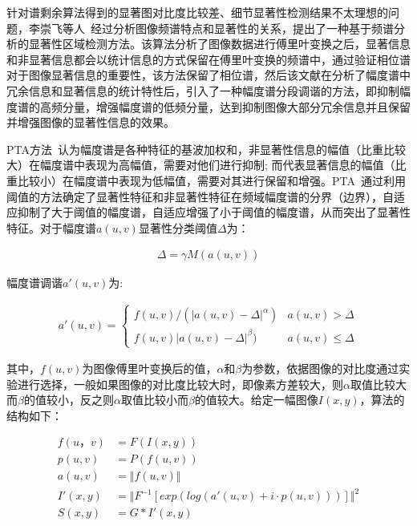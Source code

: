 针对谱剩余算法得到的显著图对比度比较差、细节显著性检测结果不太理想的问题，李崇飞等人~\cite{李崇飞2012相位谱}经过分析图像频谱特点和显著性的关系，提出了一种基于频谱分析的显著性区域检测方法。该算法分析了图像数据进行傅里叶变换之后，显著信息和非显著信息都会以统计信息的方式保留在傅里叶变换的频谱中，通过验证相位谱对于图像显著信息的重要性，该方法保留了相位谱，然后该文献在分析了幅度谱中冗余信息和显著信息的统计特性后，引入了一种幅度谱分段调谐的方法，即抑制幅度谱的高频分量，增强幅度谱的低频分量，达到抑制图像大部分冗余信息并且保留并增强图像的显著性信息的效果。

PTA方法~\cite{李崇飞2012相位谱}认为幅度谱是各种特征的基波加权和，非显著性信息的幅值（比重比较大）在幅度谱中表现为高幅值，需要对他们进行抑制; 而代表显著信息的幅值（比重比较小）在幅度谱中表现为低幅值，需要对其进行保留和增强。PTA~\cite{李崇飞2012相位谱}通过利用阈值的方法确定了显著性特征和非显著性特征在频域幅度谱的分界（边界），自适应抑制了大于阈值的幅度谱，自适应增强了小于阈值的幅度谱，从而突出了显著性特征。对于幅度谱$a(u,v)$显著性分类阈值$\Delta$为：
\begin{linenomath}
\begin{align}
\Delta=\gamma M(a(u,v))
\label{式3_20}
\end{align}
\end{linenomath}
幅度谱调谐$a'(u,v)$为:
\begin{linenomath}
\begin{align}
a'(u,v) = \left\{ \begin{array}{ll}
f(u,v)/(|a(u,v)-\Delta|^{\alpha}) & a(u,v)>\Delta\\
f(u,v)|a(u,v)-\Delta|^{\beta}) & a(u,v)\leq \Delta
\end{array} \right.
\label{式3_21}
\end{align}
\end{linenomath}
其中，$f(u,v)$为图像傅里叶变换后的值，$\alpha$和$\beta$为参数，依据图像的对比度通过实验进行选择，一般如果图像的对比度比较大时，即像素方差较大，则$\alpha$取值比较大而$\beta$的值较小，反之则$\alpha$取值比较小而$\beta$的值较大。给定一幅图像$I(x,y)$，算法的结构如下：
\begin{linenomath}
\begin{align}
f(u，v) &= F(I(x,y))\label{式3_22}\\
p(u,v) &= P(f(u,v))\label{式3_23}\\
a(u,v) &= \Vert f(u,v)\Vert \label{24}\\
I'(x,y) &= \Vert F^{-1}[exp(log(a'(u,v)+i\cdot p(u,v)))]\Vert^{2}\label{式3_25}\\
S(x,y) &= G\ast I'(x,y)\label{式3_26}
\end{align}
\end{linenomath}

